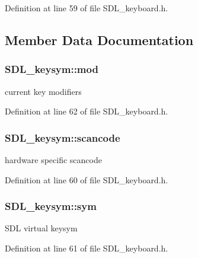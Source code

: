 Definition at line 59 of file S\+D\+L\+\_\+keyboard.\+h.



\subsection{Member Data Documentation}
\hypertarget{struct_s_d_l__keysym_ac5da46a4cf8aea69b0b1cb3f9224c91c}{}
\subsubsection[{mod}]{ S\+D\+L\+\_\+keysym\+::mod}\label{struct_s_d_l__keysym_ac5da46a4cf8aea69b0b1cb3f9224c91c}
current key modifiers 

Definition at line 62 of file S\+D\+L\+\_\+keyboard.\+h.

\hypertarget{struct_s_d_l__keysym_a1ea71b1de132939909302dc14e5f468c}{}
\subsubsection[{scancode}]{ S\+D\+L\+\_\+keysym\+::scancode}\label{struct_s_d_l__keysym_a1ea71b1de132939909302dc14e5f468c}
hardware specific scancode 

Definition at line 60 of file S\+D\+L\+\_\+keyboard.\+h.

\hypertarget{struct_s_d_l__keysym_a2a22c7afc8239b19cd18dda3aa26b70c}{}
\subsubsection[{sym}]{ S\+D\+L\+\_\+keysym\+::sym}\label{struct_s_d_l__keysym_a2a22c7afc8239b19cd18dda3aa26b70c}
S\+D\+L virtual keysym 

Definition at line 61 of file S\+D\+L\+\_\+keyboard.\+h.

\hypertarget{struct_s_d_l__keysym_a683a8e5de4e6dc6de95f670f6275cb0c}{}
